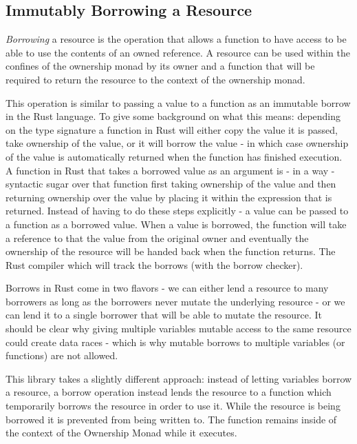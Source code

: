 \documentclass[onehalf,11pt]{beavtex}
\begin{document}
\subsection{Immutably Borrowing a Resource}

\textit{Borrowing} a resource is the operation that allows a function to have
access to be able to use the contents of an owned reference.
A resource can be used within the confines of the ownership monad by its owner
and a function that will be required to return the resource to the context of
the ownership monad.

This operation is similar to passing a value to a function as an immutable
borrow in the Rust language.  To give some background on what this means:
depending on the type signature a function in Rust will either copy the value
it is passed, take ownership of the value, or it will borrow the value - in
which case ownership of the value is automatically returned when the function
has finished execution.\cite{rust_book_ownership}
A function in Rust that takes a borrowed value as an argument is - in a way -
syntactic sugar over that function first taking ownership of the value and then
returning ownership over the value by placing it within the expression that is
returned.
Instead of having to do these steps explicitly - a value can be passed to a
function as a borrowed value.  When a value is borrowed, the function will take
a reference to that the value from the original owner and eventually the
ownership of the resource will be handed back when the function returns.
The Rust compiler which will track the borrows (with the borrow checker).

Borrows in Rust come in two flavors - we can either lend a resource to many
borrowers as long as the borrowers never mutate the underlying resource - or we
can lend it to a single borrower that will be able to mutate the
resource.\cite{rust_book_borrowing}
It should be clear why giving multiple variables mutable access to
the same resource could create data races - which is why mutable borrows to
multiple variables (or functions) are not allowed.

This library takes a slightly different approach: instead of letting variables
borrow a resource, a borrow operation instead lends the resource to a function
which temporarily borrows the resource in order to use it.  While the resource
is being borrowed it is prevented from being written to. The function remains
inside of the context of the Ownership Monad while it executes.
\end{document}
